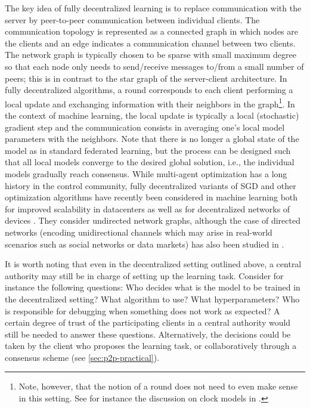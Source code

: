 \documentclass[11pt]{article}
\begin{document}
The key idea of fully decentralized learning is to replace communication with the server by peer-to-peer communication between individual clients. The communication topology is represented as a connected graph in which nodes are the clients and an edge indicates a communication channel between two clients. The network graph is typically chosen to be sparse with small maximum degree so that each node only needs to send/receive messages to/from a small number of peers; this is in contrast to the star graph of the server-client architecture. In fully decentralized algorithms, a round corresponds to each client performing a local update and exchanging information with their neighbors in the graph\footnote{Note, however, that the notion of a round does not need to even make sense in this setting. See for instance the discussion on clock models in \citep{Boyd2006}.}. In the context of machine learning, the local update is typically a local (stochastic) gradient step and the communication consists in averaging one's local model parameters with the neighbors. Note that there is no longer a global state of the model as in standard federated learning, but the process can be designed such that all local models converge to the desired global solution, i.e., the individual models gradually reach consensus. While multi-agent optimization has a long history in the control community, fully decentralized variants of SGD and other optimization algorithms have recently been considered in machine learning both for improved scalability in datacenters \citep{assran2019stochastic} as well as for decentralized networks of devices \citep{Colin2016, Vanhaesebrouck2017, Tang2018, Bellet2018a, Koloskova2019, Lalitha2019, elgabligadmm}. They consider undirected network graphs, although the case of directed networks (encoding unidirectional channels which may arise in real-world scenarios such as social networks or data markets) has also been studied in \citep{assran2019stochastic, he2019central}.

It is worth noting that even in the decentralized setting outlined above, a central authority may still be in charge of setting up the learning task. Consider for instance the following questions: Who decides what is the model to be trained in the decentralized setting? What algorithm to use? What hyperparameters? Who is responsible for debugging when something does not work as expected? A certain degree of trust of the participating clients in a central authority would still be needed to answer these questions. Alternatively, the decisions could be taken by the client who proposes the learning task, or collaboratively through a consensus scheme (see \cref{sec:p2p-practical}).
\end{document}
